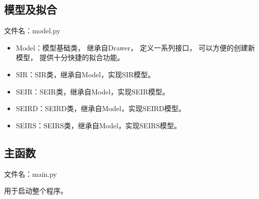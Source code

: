 \begin{appendix}
      \subsection{模型及拟合}
      \par 文件名：model.py
      \begin{itemize}
            \item Model：模型基础类，
                  继承自Drawer，
                  定义一系列接口，
                  可以方便的创建新模型，
                  提供十分快捷的拟合功能。
            \item SIR：SIR类，继承自Model，实现SIR模型。
            \item SEIR：SEIR类，继承自Model，实现SEIR模型。
            \item SEIRD：SEIRD类，继承自Model，实现SEIRD模型。
            \item SEIRS：SEIRS类，继承自Model，实现SEIRS模型。
      \end{itemize}
      
      \subsection{主函数}
      \par 文件名：main.py
      \par 用于启动整个程序。
      
\end{appendix}